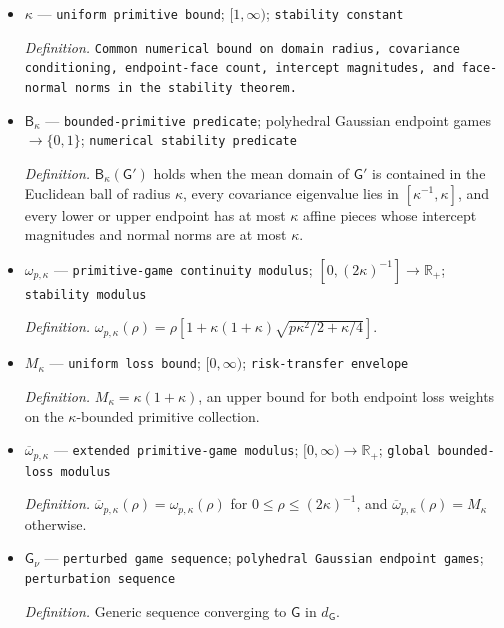 \documentclass{article}
\begin{document}
\begin{itemize}
  \item \(\kappa\) --- \texttt{uniform primitive bound}; \([1,\infty)\); \texttt{stability constant}
  \par\smallskip\noindent\emph{Definition.} \texttt{Common numerical bound on domain radius,\allowbreak{} covariance conditioning,\allowbreak{} endpoint-\allowbreak{}face count,\allowbreak{} intercept magnitudes,\allowbreak{} and face-\allowbreak{}normal norms in the stability theorem.}
  \item \(\mathsf B_{\kappa}\) --- \texttt{bounded-\allowbreak{}primitive predicate}; polyhedral Gaussian endpoint games \(\to\{0,1\}\); \texttt{numerical stability predicate}
  \par\smallskip\noindent\emph{Definition.} \(\mathsf B_{\kappa}(\mathsf G')\) holds when the mean domain of \(\mathsf G'\) is contained in the Euclidean ball of radius \(\kappa\), every covariance eigenvalue lies in \([\kappa^{-1},\kappa]\), and every lower or upper endpoint has at most \(\kappa\) affine pieces whose intercept magnitudes and normal norms are at most \(\kappa\).
  \item \(\omega_{p,\kappa}\) --- \texttt{primitive-\allowbreak{}game continuity modulus}; \([0,(2\kappa)^{-1}]\to\mathbb R_{+}\); \texttt{stability modulus}
  \par\smallskip\noindent\emph{Definition.} \(\omega_{p,\kappa}(\rho)=\rho\left[1+\kappa(1+\kappa)\sqrt{p\kappa^2/2+\kappa/4}\right]\).
  \item \(M_{\kappa}\) --- \texttt{uniform loss bound}; \([0,\infty)\); \texttt{risk-\allowbreak{}transfer envelope}
  \par\smallskip\noindent\emph{Definition.} \(M_{\kappa}=\kappa(1+\kappa)\), an upper bound for both endpoint loss weights on the \(\kappa\)-bounded primitive collection.
  \item \(\overline\omega_{p,\kappa}\) --- \texttt{extended primitive-\allowbreak{}game modulus}; \([0,\infty)\to\mathbb R_{+}\); \texttt{global bounded-\allowbreak{}loss modulus}
  \par\smallskip\noindent\emph{Definition.} \(\overline\omega_{p,\kappa}(\rho)=\omega_{p,\kappa}(\rho)\) for \(0\le\rho\le(2\kappa)^{-1}\), and \(\overline\omega_{p,\kappa}(\rho)=M_{\kappa}\) otherwise.
  \item \(\mathsf G_{\nu}\) --- \texttt{perturbed game sequence}; \texttt{polyhedral Gaussian endpoint games}; \texttt{perturbation sequence}
  \par\smallskip\noindent\emph{Definition.} Generic sequence converging to \(\mathsf G\) in \(d_{\mathsf G}\).

\end{itemize}
\end{document}
